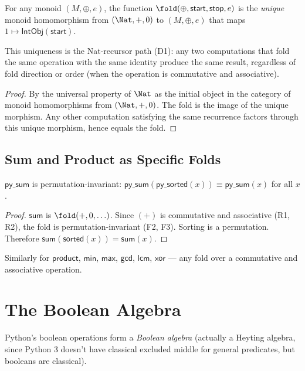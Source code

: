 \begin{theorem}
\label{thm:fold-universal}
For any monoid $(M, \oplus, e)$, the function
$\fold(\oplus, \mathsf{start}, \mathsf{stop}, e)$ is the
\emph{unique} monoid homomorphism from $(\Nat, +, 0)$ to $(M, \oplus, e)$
that maps $1 \mapsto \mathsf{IntObj}(\mathsf{start})$.

This uniqueness is the Nat-recursor path (D1): any two computations
that fold the same operation with the same identity produce the same
result, regardless of fold direction or order (when the operation
is commutative and associative).
\end{theorem}

\begin{proof}
By the universal property of $\Nat$ as the initial object in the
category of monoid homomorphisms from $(\Nat, +, 0)$.  The fold
is the image of the unique morphism.  Any other computation satisfying
the same recurrence factors through this unique morphism, hence
equals the fold.
\end{proof}

\subsection{Sum and Product as Specific Folds}

\begin{corollary}
$\mathsf{py\_sum}$ is permutation-invariant:
$\mathsf{py\_sum}(\mathsf{py\_sorted}(x)) \equiv \mathsf{py\_sum}(x)$
for all $x$.
\end{corollary}

\begin{proof}
$\mathsf{sum}$ is $\fold(+, 0, \ldots)$.  Since $(+)$ is commutative
and associative (R1, R2), the fold is permutation-invariant (F2, F3).
Sorting is a permutation.  Therefore
$\mathsf{sum}(\mathsf{sorted}(x)) = \mathsf{sum}(x)$.
\end{proof}

Similarly for $\mathsf{product}$, $\mathsf{min}$, $\mathsf{max}$,
$\mathsf{gcd}$, $\mathsf{lcm}$, $\mathsf{xor}$ --- any fold over
a commutative and associative operation.


\section{The Boolean Algebra}

Python's boolean operations form a \emph{Boolean algebra} (actually
a Heyting algebra, since Python 3 doesn't have classical excluded
middle for general predicates, but booleans are classical).

